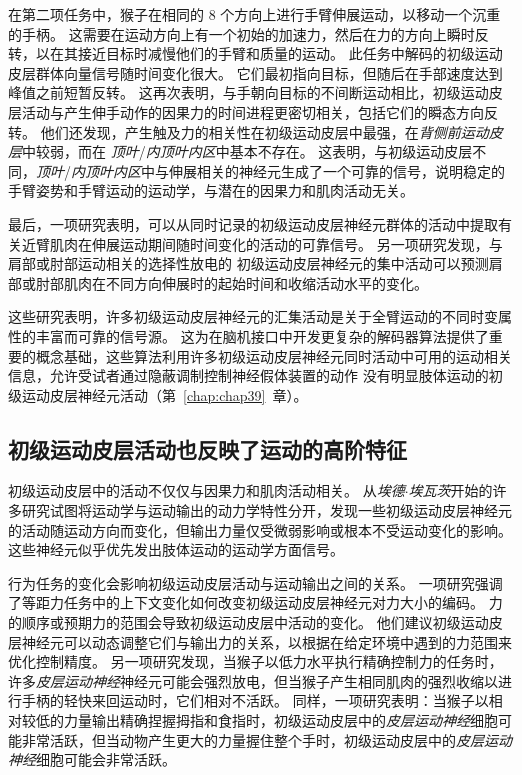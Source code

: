 在第二项任务中，猴子在相同的 8 个方向上进行手臂伸展运动，以移动一个沉重的手柄。
这需要在运动方向上有一个初始的加速力，然后在力的方向上瞬时反转，以在其接近目标时减慢他们的手臂和质量的运动。
此任务中解码的初级运动皮层群体向量信号随时间变化很大。
它们最初指向目标，但随后在手部速度达到峰值之前短暂反转。
这再次表明，与手朝向目标的不间断运动相比，初级运动皮层活动与产生伸手动作的因果力的时间进程更密切相关，包括它们的瞬态方向反转。
他们还发现，产生触及力的相关性在初级运动皮层中最强，在\textit{背侧前运动皮层}中较弱，而在 \textit{顶叶}/\textit{内顶叶内区}中基本不存在。
这表明，与初级运动皮层不同，\textit{顶叶}/\textit{内顶叶内区}中与伸展相关的神经元生成了一个可靠的信号，说明稳定的手臂姿势和手臂运动的运动学，与潜在的因果力和肌肉活动无关。


最后，一项研究表明，可以从同时记录的初级运动皮层神经元群体的活动中提取有关近臂肌肉在伸展运动期间随时间变化的活动的可靠信号。
另一项研究发现，与肩部或肘部运动相关的选择性放电的 初级运动皮层神经元的集中活动可以预测肩部或肘部肌肉在不同方向伸展时的起始时间和收缩活动水平的变化。


这些研究表明，许多初级运动皮层神经元的汇集活动是关于全臂运动的不同时变属性的丰富而可靠的信号源。
这为在脑机接口中开发更复杂的解码器算法提供了重要的概念基础，这些算法利用许多初级运动皮层神经元同时活动中可用的运动相关信息，允许受试者通过隐蔽调制控制神经假体装置的动作 没有明显肢体运动的初级运动皮层神经元活动（第~\ref{chap:chap39}~章）。



\subsection{初级运动皮层活动也反映了运动的高阶特征}

初级运动皮层中的活动不仅仅与因果力和肌肉活动相关。
从\textit{埃德$\cdot$埃瓦茨}开始的许多研究试图将运动学与运动输出的动力学特性分开，发现一些初级运动皮层神经元的活动随运动方向而变化，但输出力量仅受微弱影响或根本不受运动变化的影响。
这些神经元似乎优先发出肢体运动的运动学方面信号。


行为任务的变化会影响初级运动皮层活动与运动输出之间的关系。
一项研究强调了等距力任务中的上下文变化如何改变初级运动皮层神经元对力大小的编码。
力的顺序或预期力的范围会导致初级运动皮层中活动的变化。
他们建议初级运动皮层神经元可以动态调整它们与输出力的关系，以根据在给定环境中遇到的力范围来优化控制精度。
另一项研究发现，当猴子以低力水平执行精确控制力的任务时，许多\textit{皮层运动神经}神经元可能会强烈放电，但当猴子产生相同肌肉的强烈收缩以进行手柄的轻快来回运动时，它们相对不活跃。
同样，一项研究表明：当猴子以相对较低的力量输出精确捏握拇指和食指时，初级运动皮层中的\textit{皮层运动神经}细胞可能非常活跃，但当动物产生更大的力量握住整个手时，初级运动皮层中的\textit{皮层运动神经}细胞可能会非常活跃。


